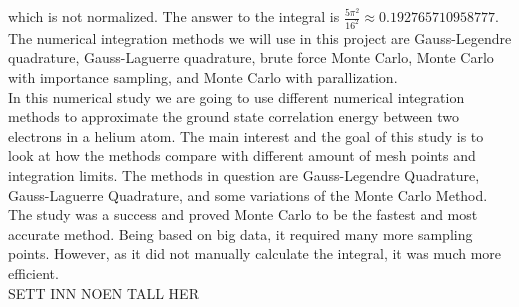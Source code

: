 \documentclass{article}
\begin{document}
which is not normalized. The answer to the integral is $\frac{5 \pi^2}{16^2} \approx 0.192765710958777$. The numerical integration methods we will use in this project are Gauss-Legendre quadrature, Gauss-Laguerre quadrature, brute force Monte Carlo, Monte Carlo with importance sampling, and Monte Carlo with parallization. \\

In this numerical study we are going to use different numerical integration methods to approximate the ground state correlation energy between two electrons in a helium atom. The main interest and the goal of this study is to look at how the methods compare with different amount of mesh points and integration limits. The methods in question are Gauss-Legendre Quadrature, Gauss-Laguerre Quadrature, and some variations of the Monte Carlo Method.
The study was a success and proved Monte Carlo to be the fastest and most accurate method. Being based on big data, it required many more sampling points. However, as it did not manually calculate the integral, it was much more efficient.\\
SETT INN NOEN TALL HER
\end{document}
